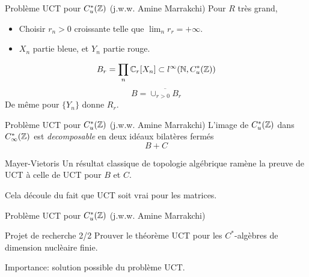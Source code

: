 \begin{frame}{Probl\`eme UCT pour $C^*_u(\mathbb Z)$ (j.w.w. Amine Marrakchi)}
Pour $R$ tr\`es grand,
\begin{center}
\end{center}
\begin{itemize}
\item Choisir $r_n>0$ croissante telle que $\lim_n r_r = +\infty$.
\item $X_n$ partie bleue, et $Y_n$ partie rouge.
\end{itemize}
\[ B_r= \prod_n \mathbb C_r[X_n] \subset l^\infty (\mathbb N , C^*_u(\mathbb Z))\]
\[B = \overline{\cup_{r>0} B_r}\]
De m\^eme pour $\{Y_n\}$ donne $R_r$.
\end{frame}

\begin{frame}{Probl\`eme UCT pour $C^*_u(\mathbb Z)$ (j.w.w. Amine Marrakchi)}
L'image de $C^*_u(\mathbb Z)$ dans $C^*_\infty(\mathbb Z)$ est \textit{decomposable} en deux id\'eaux bilat\`eres ferm\'es 
\[B+C\]
\vfill
\begin{block}{Mayer-Vietoris}
Un r\'esultat classique de topologie alg\'ebrique ram\`ene la preuve de UCT \`a celle de UCT pour $B$ et $C$.
\end{block}
\vfill
Cela d\'ecoule du fait que UCT soit vrai pour les matrices.
\end{frame}

\begin{frame}{Probl\`eme UCT pour $C^*_u(\mathbb Z)$ (j.w.w. Amine Marrakchi)}
\begin{block}{Projet de recherche 2/2}
Prouver le th\'eor\`eme UCT pour les $C^*$-alg\`ebres de dimension nucl\`eaire finie.
\end{block}
\vfill
Importance: solution possible du probl\`eme UCT.
\end{frame}

